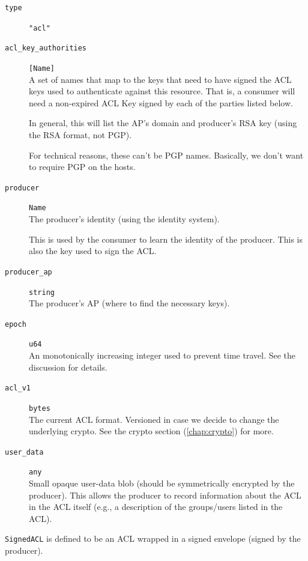 \documentclass[pdftex,12pt,a4papaer,twoside,notitlepage]{report}
\begin{document}
\begin{appendices}
\begin{leftbar}
\begin{description}
\item[\texttt{type}] \verb|"acl"|
\item[\texttt{acl\_key\_authorities}] \verb=[Name]= \\
  A set of names that map to the keys that need to have signed the ACL keys used
  to authenticate against this resource. That is, a consumer will need a
  non-expired ACL Key signed by each of the parties listed below.
  
  In general, this will list the AP's domain and producer's RSA key (using the
  RSA format, not PGP).
  
  For technical reasons, these can't be PGP names. Basically, we don't want to
  require PGP on the hosts.

\item[\texttt{producer}] \texttt{Name} \\
  The producer's identity (using the identity system).
  
  This is used by the consumer to learn the identity of the producer. This is
  also the key used to sign the ACL.

\item[\texttt{producer\_ap}] \texttt{string} \\
  The producer's AP (where to find the necessary keys).

\item[\texttt{epoch}] \texttt{u64} \\
  An monotonically increasing integer used to prevent
  time travel. See the discussion for details.

\item[\texttt{acl\_v1}] \texttt{bytes} \\
  The current ACL format. Versioned in case we decide to change the underlying
  crypto. See the crypto section (\cref{chap:crypto}) for more.

\item[\texttt{user\_data}] \texttt{any} \\
  Small opaque user-data blob (should be symmetrically encrypted by the
  producer). This allows the producer to record information about the ACL in the
  ACL itself (e.g., a description of the groups/users listed in the ACL).
\end{description}
\end{leftbar}

\texttt{SignedACL} is defined to be an ACL wrapped in a signed envelope (signed
by the producer).


\end{appendices}
\end{document}
